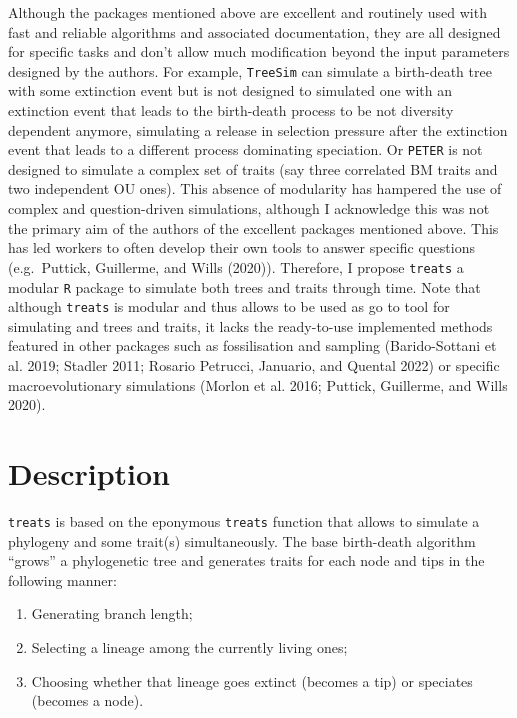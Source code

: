 \documentclass[
]{article}
\providecommand{\tightlist}{%
  \setlength{\itemsep}{0pt}\setlength{\parskip}{0pt}}
\begin{document}
Although the packages mentioned above are excellent and routinely used
with fast and reliable algorithms and associated documentation, they are
all designed for specific tasks and don't allow much modification beyond
the input parameters designed by the authors. For example,
\texttt{TreeSim} can simulate a birth-death tree with some extinction
event but is not designed to simulated one with an extinction event that
leads to the birth-death process to be not diversity dependent anymore,
simulating a release in selection pressure after the extinction event
that leads to a different process dominating speciation. Or
\texttt{PETER} is not designed to simulate a complex set of traits (say
three correlated BM traits and two independent OU ones). This absence of
modularity has hampered the use of complex and question-driven
simulations, although I acknowledge this was not the primary aim of the
authors of the excellent packages mentioned above. This has led workers
to often develop their own tools to answer specific questions
(e.g.~Puttick, Guillerme, and Wills (2020)). Therefore, I propose
\texttt{treats} a modular \texttt{R} package to simulate both trees and
traits through time. Note that although \texttt{treats} is modular and
thus allows to be used as go to tool for simulating and trees and
traits, it lacks the ready-to-use implemented methods featured in other
packages such as fossilisation and sampling (Barido-Sottani et al. 2019;
Stadler 2011; Rosario Petrucci, Januario, and Quental 2022) or specific
macroevolutionary simulations (Morlon et al. 2016; Puttick, Guillerme,
and Wills 2020).

\hypertarget{description}{%
\section{Description}\label{description}}

\texttt{treats} is based on the eponymous \texttt{treats} function that
allows to simulate a phylogeny and some trait(s) simultaneously. The
base birth-death algorithm ``grows'' a phylogenetic tree and generates
traits for each node and tips in the following manner:

\begin{enumerate}
\def\labelenumi{\arabic{enumi}.}
\tightlist
\item
  Generating branch length;
\item
  Selecting a lineage among the currently living ones;
\item
  Choosing whether that lineage goes extinct (becomes a tip) or
  speciates (becomes a node).
\end{enumerate}
\end{document}
